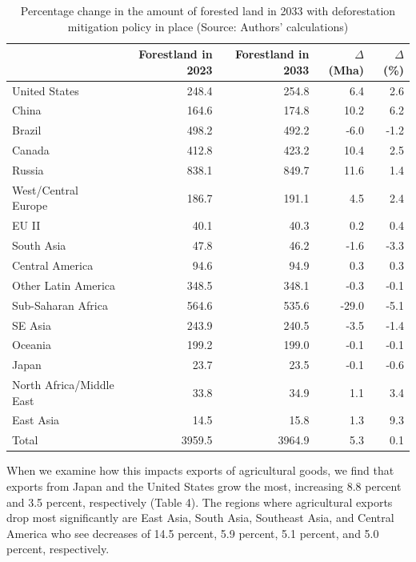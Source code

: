 \documentclass[
]{article}
\begin{document}
\begin{table}
\centering
\caption{\label{tab:unnamed-chunk-4}Percentage change in the amount of forested land in 2033 with deforestation mitigation policy in place (Source: Authors' calculations)}
\centering
\begin{tabular}[t]{|>{}l|r|r|r|>{}r|}
\hline
  & Forestland in 2023 & Forestland in 2033 & $\Delta$ (Mha) & $\Delta$ (\%)\\
\hline
United States & 248.4 & 254.8 & 6.4 & 2.6\\
\hline
China & 164.6 & 174.8 & 10.2 & 6.2\\
\hline
Brazil & 498.2 & 492.2 & -6.0 & -1.2\\
\hline
Canada & 412.8 & 423.2 & 10.4 & 2.5\\
\hline
Russia & 838.1 & 849.7 & 11.6 & 1.4\\
\hline
West/Central Europe & 186.7 & 191.1 & 4.5 & 2.4\\
\hline
EU II & 40.1 & 40.3 & 0.2 & 0.4\\
\hline
South Asia & 47.8 & 46.2 & -1.6 & -3.3\\
\hline
Central America & 94.6 & 94.9 & 0.3 & 0.3\\
\hline
Other Latin America & 348.5 & 348.1 & -0.3 & -0.1\\
\hline
Sub-Saharan Africa & 564.6 & 535.6 & -29.0 & -5.1\\
\hline
SE Asia & 243.9 & 240.5 & -3.5 & -1.4\\
\hline
Oceania & 199.2 & 199.0 & -0.1 & -0.1\\
\hline
Japan & 23.7 & 23.5 & -0.1 & -0.6\\
\hline
North Africa/Middle East & 33.8 & 34.9 & 1.1 & 3.4\\
\hline
East Asia & 14.5 & 15.8 & 1.3 & 9.3\\
\hline
Total & 3959.5 & 3964.9 & 5.3 & 0.1\\
\hline
\end{tabular}
\end{table}

When we examine how this impacts exports of agricultural goods, we find that exports from Japan and the United States grow the most, increasing 8.8 percent and 3.5 percent, respectively (Table 4). The regions where agricultural exports drop most significantly are East Asia, South Asia, Southeast Asia, and Central America who see decreases of 14.5 percent, 5.9 percent, 5.1 percent, and 5.0 percent, respectively.
\end{document}
